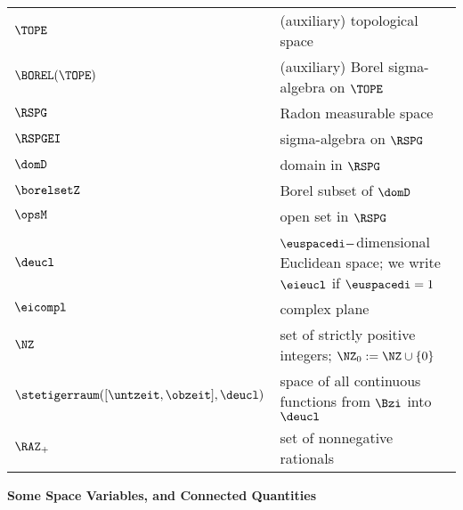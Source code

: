 \begin{longtable}{ll}

$\TOPE$ & (auxiliary) topological space
\\
$\BOREL(\TOPE)$ & (auxiliary) Borel sigma-algebra on $\TOPE$
\\
$\RSPG$ & Radon measurable space 
\\
$\RSPGEI$ & sigma-algebra on $\RSPG$
\\
$\domD$ & domain in $\RSPG$ 
\\
$\borelsetZ$ & Borel subset of $\domD$ 
\\
$\opsM$ & open set in $\RSPG$ 
\\
$\deucl$ & $\euspacedi-$dimensional Euclidean space;
we write $\eieucl$ if $\euspacedi=1$ 
\\
$\eicompl$ & complex plane 
\\
$\NZ$ & set of strictly positive integers;  $\NZ_{0} := \NZ \cup \{0\}$
\\
${\stetigerraum}([\untzeit,\obzeit],\deucl)$ &  space
of all continuous functions from $\Bzi$ into $\deucl$
\\
$\RAZ_+$ & set of nonnegative rationals
\\
 
\end{longtable}







{\large \bf Some Space Variables, and Connected Quantities}


